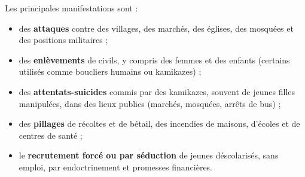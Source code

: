 \documentclass[11pt]{article}
\begin{document}
Les principales manifestations sont :
\begin{itemize}
\item des \textbf{attaques} contre des villages, des marchés, des églises, des mosquées et des positions militaires ;
\item des \textbf{enlèvements} de civils, y compris des femmes et des enfants (certains utilisés comme boucliers humains ou kamikazes) ;
\item des \textbf{attentats-suicides} commis par des kamikazes, souvent de jeunes filles manipulées, dans des lieux publics (marchés, mosquées, arrêts de bus) ;
\item des \textbf{pillages} de récoltes et de bétail, des incendies de maisons, d'écoles et de centres de santé ;
\item le \textbf{recrutement forcé ou par séduction} de jeunes déscolarisés, sans emploi, par endoctrinement et promesses financières.
\end{itemize}
\end{document}
